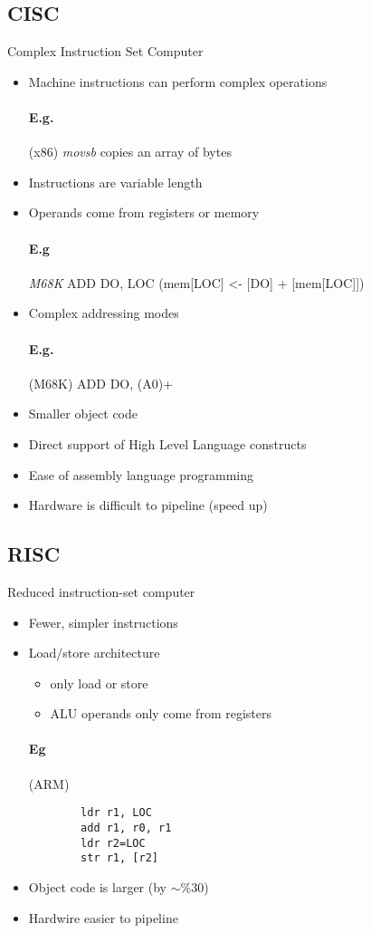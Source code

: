 \documentclass[12pt]{report}
\begin{document}
    \subsection{CISC} Complex Instruction Set Computer\\
      \begin{itemize}
        \item Machine instructions can perform complex operations
        \paragraph{E.g.} (x86) \textit{movsb} copies an array of bytes
        \item Instructions are variable length
        \item Operands come from registers or memory
        \paragraph{E.g} \textit{M68K} ADD DO, LOC (mem[LOC] \textless- [DO] +
        [mem[LOC]])
        \item Complex addressing modes
        \paragraph{E.g.} (M68K) ADD DO, (A0)+
        \item Smaller object code
        \item Direct support of High Level Language constructs
        \item Ease of assembly language programming
        \item Hardware is difficult to pipeline (speed up)
      \end{itemize}

    \subsection{RISC}
      Reduced instruction-set computer
      \begin{itemize}
        \item Fewer, simpler instructions
        \item Load/store architecture
        \begin{itemize}
          \item only load or store
          \item ALU operands only come from registers
        \end{itemize}
      \paragraph{Eg} (ARM)
      \begin{lstlisting}
        ldr r1, LOC
        add r1, r0, r1
        ldr r2=LOC
        str r1, [r2]
      \end{lstlisting}
      \item Object code is larger (by $\sim$\%30)
      \item Hardwire easier to pipeline
      \end{itemize}
\end{document}
